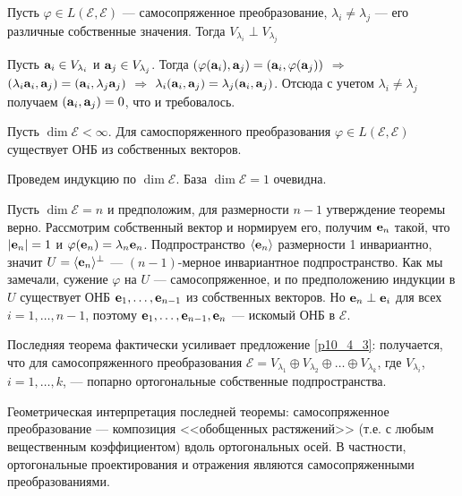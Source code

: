 \begin{predl}\label{p10_4_3} 
Пусть $\varphi\in L(\mathcal{E}, \mathcal{E})$ --- самосопряженное преобразование,
$\lambda _i\neq \lambda _j$ --- его различные собственные значения. Тогда $V_{\lambda _i}\perp V_{\lambda _j}$
\end{predl}
\dok Пусть $\mathbf{a}_i\in V_{\lambda _i}$ и $\mathbf{a}_j\in V_{\lambda _j}$.
Тогда $(\varphi(\mathbf{a}_i), \mathbf{a}_j) = (\mathbf{a}_i, \varphi(\mathbf{a}_j))$ 
$\Rightarrow$   $(\lambda_i \mathbf{a}_i, \mathbf{a}_j) = (\mathbf{a}_i, \lambda_j \mathbf{a}_j)$
$\Rightarrow$   $\lambda_i  (\mathbf{a}_i, \mathbf{a}_j) = \lambda_j (\mathbf{a}_i,  \mathbf{a}_j)$. Отсюда  
с учетом $\lambda _i\neq \lambda _j$ получаем $(\mathbf{a}_i, \mathbf{a}_j) = 0$, что и требовалось.
\edok



\begin{theor}\label{t10_4_3} 
Пусть $\dim \mathcal{E}<\infty$. Для самоспоряженного преобразования $\varphi\in L(\mathcal{E}, \mathcal{E})$
существует ОНБ из собственных векторов.
\end{theor}
\dok Проведем индукцию по $\dim \mathcal{E}$. База $\dim \mathcal{E}=1$ очевидна.

Пусть $\dim \mathcal{E}=n$ и предположим, для размерности $n-1$ утверждение теоремы верно.
Рассмотрим собственный вектор и нормируем его, получим $\mathbf{e}_n$ такой, что $|\mathbf{e}_n|=1$ и $\varphi(\mathbf{e}_n)=\lambda_n \mathbf{e}_n$.
Подпространство $\langle \mathbf{e}_n \rangle$ размерности 1 инвариантно, значит $U=\langle \mathbf{e}_n \rangle^{\bot}$ --- $(n-1)$-мерное инвариантное подпространство.
Как мы замечали, сужение $\varphi$ на $U$ --- самосопряженное, и по предположению индукции в $U$ существует ОНБ $\mathbf{e}_1, \ldots, \mathbf{e}_{n-1}$ из собственных векторов.
Но $\mathbf{e}_n\perp \mathbf{e}_i$ для всех $i=1, \ldots, n-1$, поэтому $\mathbf{e}_1, \ldots, \mathbf{e}_{n-1}, \mathbf{e}_{n}$ --- искомый ОНБ в $\mathcal{E}$.
\edok

Последняя теорема фактически усиливает предложение \ref{p10_4_3}:
получается, что для самосопряженного преобразования $\mathcal{E} = V_{\lambda_1}\oplus V_{\lambda_2} \oplus \ldots \oplus V_{\lambda_k}$, 
где $V_{\lambda_i}$, $i=1, \ldots, k$, --- попарно ортогональные собственные подпространства.

Геометрическая интерпретация последней теоремы: самосопряженное преобразование ---  
композиция <<обобщенных растяжений>>  (т.е. с любым вещественным коэффициентом)
вдоль ортогональных осей. 
В частности, ортогональные проектирования и отражения являются самосопряженными преобразованиями.


